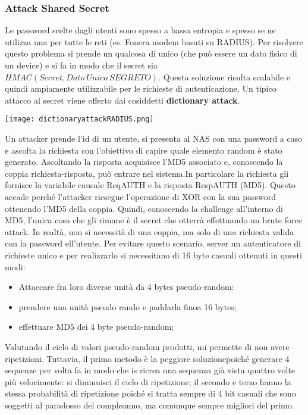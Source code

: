 \documentclass{article}
\theoremstyle{remark}
\begin{document}
\subsubsection{Attack Shared Secret}
Le password scelte dagli utenti sono spesso a bassa entropia e spesso se ne utilizza una per tutte le reti (es. Fonera modem basati su RADIUS).
Per risolvere questo problema si prende un qualcosa di unico (che può essere un dato fisico di un device) e si fa in modo che il secret sia $HMAC(Secret,Dato\ Unico\ SEGRETO)$. Questa soluzione risulta scalabile e quindi ampiamente utilizzabile per le richieste di autenticazione.
Un tipico attacco al secret viene offerto dai cosiddetti \textbf{dictionary attack}.\begin{center}
	\texttt{[image: dictionaryattackRADIUS.png]}
\end{center}
Un attacker prende l'id di un utente, si presenta al NAS con una password a caso e ascolta la richiesta con l'obiettivo di capire quale elemento random è stato generato. Ascoltando la risposta acquisisce l'MD5 associato e, conoscendo la coppia richiesta-risposta, può entrare nel sistema.In particolare la richiesta gli fornisce la variabile causale ReqAUTH e la risposta RespAUTH (MD5). Questo accade perché l'attacker riesegue l'operazione di XOR con la sua password ottenendo l'MD5 della coppia. Quindi, conoscendo la challenge all'interno di MD5, l'unica cosa che gli rimane è il secret che otterrà effettuando un brute force attack. In realtà, non si necessità di una coppia, ma solo di una richiesta valida con la password ell'utente.\newline
Per evitare questo scenario, server un autenticatore di richieste unico e per realizzarlo si necessitano di 16 byte casuali ottenuti in questi modi:\begin{itemize}
	\item Attaccare fra loro diverse unità da 4  bytes pseudo-random:
	\item prendere una unità pseudo rando e paddarla finoa  16 bytes;
	\item effettuare MD5 dei 4 byte pseudo-random;
\end{itemize}
Valutando il ciclo di valori pseudo-random prodotti, mi permette di non avere ripetizioni. Tuttavia, il primo metodo è la peggiore soluzionepoiché generare 4 sequenze per volta fa in modo che is ricrea una sequenza già vista quattro volte più velocimente: si diminuisci il ciclo di ripetizione; il secondo e terzo hanno la stessa probabilità di ripetizione poiché si tratta sempre di 4 bit casuali che sono soggetti al paradosso del compleanno, ma comunque sempre migliori del primo.
\end{document}
